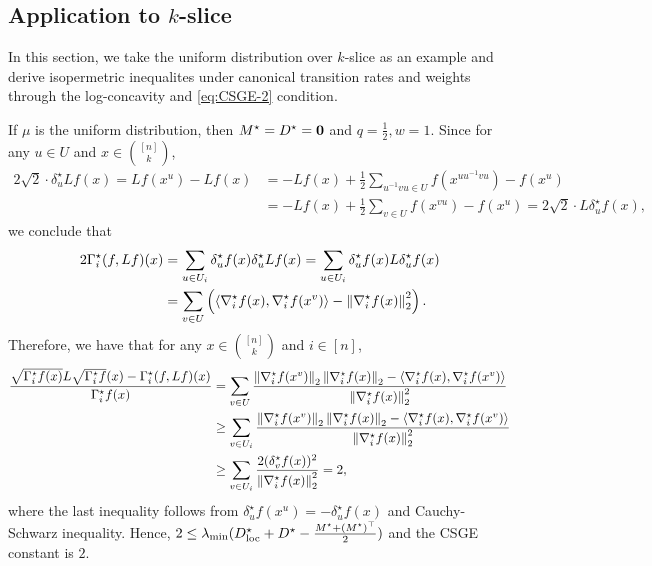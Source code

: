 \subsection{Application to $k$-slice}
In this section, we take the uniform distribution over $k$-slice as an example and derive isopermetric inequalites under canonical transition rates and weights through the log-concavity and \ref{eq:CSGE-2} condition.
\begin{example}\label{example:CSGE_uniform_k_slice}
    If $\mu$ is the uniform distribution, then $M^\star = D^\star = \*0$ and $q=\frac 12, w=1$.
    Since for any $u\in U$ and $x\in \binom{[n]}k$,
    \begin{align*}
        2\sqrt 2 \cdot \delta_u^\star L f(x) = Lf(x^u) - Lf(x) &= 
        -Lf(x) + \frac 12\sum_{u^{-1}vu \in U}f(x^{uu^{-1}vu})-f(x^u)
        \\&= -Lf(x) + \frac 12\sum_{v \in U}f(x^{vu})-f(x^u) = 2\sqrt 2 \cdot L\delta_u^\star f(x),
    \end{align*}
    we conclude that
    \begin{align*}
        2\Gamma_{i}^\star(f,Lf)(x) &= \sum_{u\in U_i}\delta_u^\star f(x) \delta_u^\star Lf(x)
        = \sum_{u\in U_i}\delta_u^\star f(x) L\delta_u^\star f(x)
        \\&= \sum_{v\in U}\tp{\inner{\nabla_i^\star f(x)}{\nabla_i^\star f(x^v)} - \norm{\nabla_i^\star f(x)}_2^2}.
    \end{align*}
    Therefore, we have that for any $x\in \binom{[n]}k$ and $i\in[n]$,
    \begin{align*}
        \frac{\sqrt{\Gamma_i^\star f(x)}L\sqrt{\Gamma_i^\star f}(x) - \Gamma_i^\star(f,Lf)(x)}{\Gamma_i^\star f(x)}
        &= \sum_{v\in U}\frac{\norm{\nabla_i^\star f(x^v)}_2\norm{\nabla_i^\star f(x)}_2 - \inner{\nabla_i^\star f(x)}{\nabla_i^\star f(x^v)}}{\norm{\nabla_i^\star f(x)}_2^2}
        \\&\geq \sum_{v\in U_i}\frac{\norm{\nabla_i^\star f(x^v)}_2\norm{\nabla_i^\star f(x)}_2 - \inner{\nabla_i^\star f(x)}{\nabla_i^\star f(x^v)}}{\norm{\nabla_i^\star f(x)}_2^2}
        \\&\geq \sum_{v\in U_i}\frac{2(\delta_v^\star f(x))^2}{\norm{\nabla_i^\star f(x)}_2^2} = 2,
    \end{align*}
    where the last inequality follows from $\delta_u^\star f(x^u) = -\delta_u^\star f(x)$ and Cauchy-Schwarz inequality.
    Hence, $2\leq \lambda_{\min}(D^\star_{\-{loc}} + D^\star - \frac{M^\star+(M^\star)^\top}{2})$ and the CSGE constant is $2$.
\end{example}
